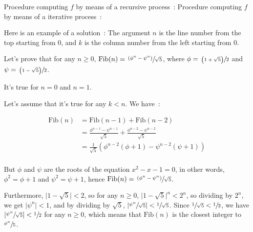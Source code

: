 \begin{exe}[1.11]
    Procedure computing $f$ by means of a recursive process :
    Procedure computing $f$ by means of a iterative process :
\end{exe}

\begin{exe}[1.12]
    Here is an example of a solution :
    The argument $n$ is the line number from the top starting from $0$, and 
    $k$ is the column number from the left starting from $0$.
\end{exe}

\begin{exe}[1.13]
    Let’s prove that for any $n \geq 0$, $\text{Fib}(n) = \sfrac{\left( \phi^n 
    - \psi^n \right)}{\sqrt{5}}$, where $\phi = \sfrac{\left( 1 + \sqrt{5} 
    \right)}{2}$ and $\psi = \sfrac{\left( 1 - \sqrt{5} \right)}{2}$.

    It’s true for $n = 0$ and $n = 1$.

    Let’s assume that it’s true for any $k < n$. We have :

    \begin{align*}
        \text{Fib}(n) &= \text{Fib}(n - 1) + \text{Fib}(n - 2) \\
        &= \frac{\phi^{n - 1} - \psi^{n - 1}}{\sqrt{5}} + \frac{\phi^{n - 2} 
        - \psi^{n - 2}}{\sqrt{5}} \\
        &= \frac{1}{\sqrt{5}}\left(\phi^{n - 2}\left(\phi + 1\right) - \psi^{n 
        - 2}\left(\psi + 1\right) \right) \\
    \end{align*}

    But $\phi$ and $\psi$ are the roots of the equation $x^2 - x - 1 = 0$, in 
    other words, $\phi^2 = \phi + 1$ and $\psi^2 = \psi + 1$, hence 
    $\text{Fib}(n) = \sfrac{\left(\phi^n - \psi^n \right)}{\sqrt{5}}$.

    Furthermore, $ \lvert 1 - \sqrt{5} \rvert < 2 $, so for any $n \geq 0$, 
    $ \lvert 1 - \sqrt{5} \rvert^n < 2^n $, so dividing by $2^n$, we get 
    $ \lvert \psi^n \rvert < 1 $, and by dividing by $\sqrt{5}$, $ \lvert 
    \sfrac{\psi^n}{\sqrt{5}} \rvert < \sfrac{1}{\sqrt{5}} $. Since 
    $ \sfrac{1}{\sqrt{5}} < \sfrac{1}{2} $, we have $ \lvert 
    \sfrac{\psi^n}{\sqrt{5}} \rvert < \sfrac{1}{2} $ for any $n \geq 0$, which 
    means that $\text{Fib}(n)$ is the closest integer to $\sfrac{\phi^n}{5}$.

\end{exe}

